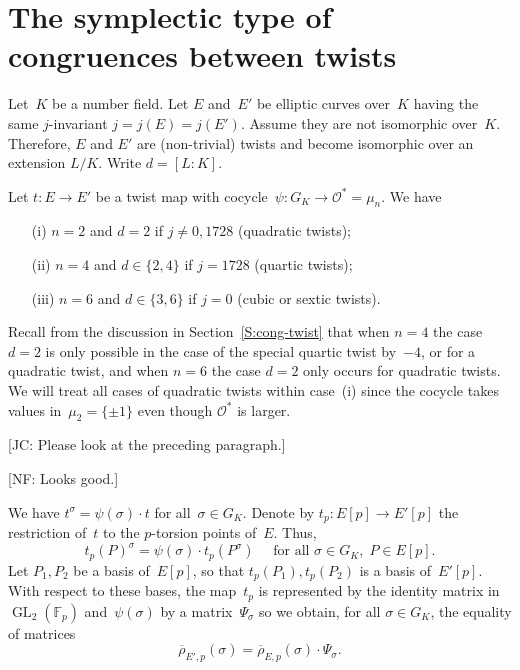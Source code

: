 \documentclass[12pt, reqno]{amsart}
\newcommand{\F}{\mathbb{F}}
\newcommand{\rhobar}{{\overline{\rho}}}
\newcommand{\calO}{\mathcal{O}}
\newcommand{\GL}{\operatorname{GL}}
\numberwithin{equation}{section}
\theoremstyle{definition}
\theoremstyle{remark}
\newcommand{\nf}[1]{{\color{blue} \textsf{[NF: #1]}}}
\newcommand{\jc}[1]{{\color{darkgreen} \textsf{[JC: #1]}}}
\begin{document}

\section{The symplectic type of congruences between twists} \label{S:type}

Let~$K$ be a number field. Let $E$ and~$E'$ be elliptic curves over~$K$ having the same $j$-invariant $j = j(E) = j(E')$. Assume they are not 
isomorphic over~$K$. Therefore, $E$ and $E'$ are (non-trivial) twists and become isomorphic over an extension $L/K$. Write $d = [L : K]$. 

Let $t : E \to E'$ be a twist map with 
cocycle~$\psi : G_K \to \calO^* = \mu_n$.
We have 
\begin{itemize}
 \item[(i)] $n=2$ and $d = 2$ if $j  \neq 0, 1728$ (quadratic twists);
 \item[(ii)] $n=4$ and $d \in \{2,4\}$ if $j = 1728$ (quartic twists);
  \item[(iii)] $n=6$ and $d \in \{3,6\}$ if $j = 0$ (cubic or sextic twists).
\end{itemize}

Recall from the discussion in Section~\ref{S:cong-twist} that when
$n=4$ the case $d=2$ is only possible in the case of the special
quartic twist by~$-4$, or for a quadratic twist, and when $n=6$ the
case $d=2$ only occurs for quadratic twists.  We will treat all cases
of quadratic twists within case~(i) since the cocycle takes values
in~$\mu_2=\{\pm1\}$ even though $\calO^*$ is larger.

\jc{Please look at the preceding paragraph.}

\nf{Looks good.}

We have $t^\sigma = \psi(\sigma) \cdot t$ for all~$\sigma \in G_K$. 
Denote by $t_p : E[p] \to E'[p]$ the restriction of~$t$ to the $p$-torsion points of~$E$. Thus,
\begin{equation}\label{E:cocycle}
   t_p(P)^\sigma = \psi(\sigma) \cdot t_p(P^\sigma) \quad \text{ for all } \sigma \in G_K,
  \; P \in E[p].
\end{equation}
Let $P_1, P_2$ be a basis of~$E[p]$, so that $t_p(P_1), t_p(P_2)$ is a
basis of~$E'[p]$.  With respect to these bases, the map~$t_p$ is
represented by the identity matrix in~$\GL_2(\F_p)$ and~$\psi(\sigma)$
by a matrix~$\Psi_\sigma$ so we obtain, for all $\sigma \in G_K$, the
equality of matrices
\begin{equation} \label{E:PsiMatrix}
 \rhobar_{E',p}(\sigma) = \rhobar_{E,p}(\sigma) \cdot \Psi_\sigma. 
\end{equation}
\end{document}
